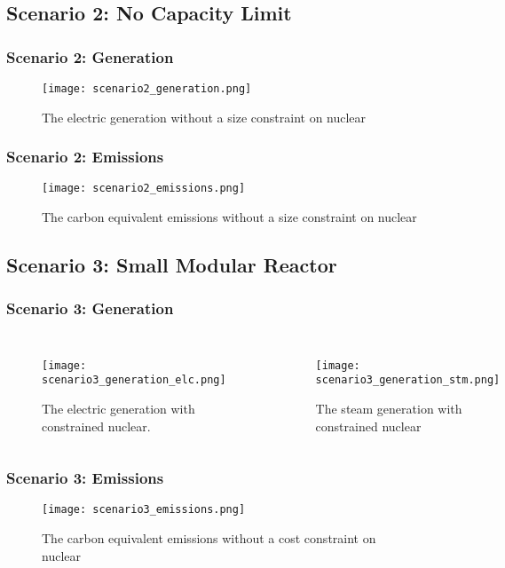 \subsection{Scenario 2: No Capacity Limit}
\begin{frame}
  \frametitle{Scenario 2: Generation}
  \begin{figure}
    \texttt{[image: scenario2\_generation.png]}
    \caption{The electric generation without a size constraint on nuclear}
    \label{fig:gen02}
  \end{figure}
\end{frame}
\begin{frame}
  \frametitle{Scenario 2: Emissions}
  \begin{figure}
    \texttt{[image: scenario2\_emissions.png]}
    \caption{The carbon equivalent emissions without a size constraint on nuclear}
    \label{fig:emit02}
  \end{figure}
\end{frame}
\subsection{Scenario 3: Small Modular Reactor}
\begin{frame}
  \frametitle{Scenario 3: Generation}
  \begin{columns}
    \column[t]{5cm}
    \begin{figure}
      \texttt{[image: scenario3\_generation\_elc.png]}
      \caption{The electric generation with constrained nuclear.}
      \label{fig:gen03elc}
    \end{figure}
    \column[t]{5cm}
    \begin{figure}
      \texttt{[image: scenario3\_generation\_stm.png]}
      \caption{The steam generation with constrained nuclear}
      \label{fig:gen02stm}
    \end{figure}
  \end{columns}
\end{frame}
\begin{frame}
  \frametitle{Scenario 3: Emissions}
  \begin{figure}
    \texttt{[image: scenario3\_emissions.png]}
    \caption{The carbon equivalent emissions without a cost constraint on nuclear}
    \label{fig:emit03}
  \end{figure}
\end{frame}

